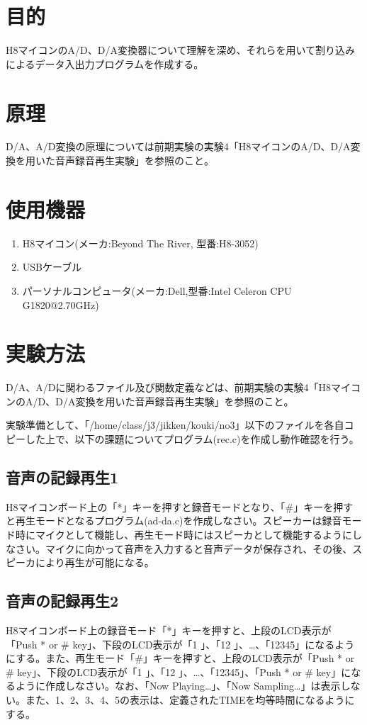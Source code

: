 \documentclass{jarticle}
\begin{document}
\section{目的}
H8マイコンのA/D、D/A変換器について理解を深め、それらを用いて割り込みによるデータ入出力プログラムを作成する。

\section{原理}
D/A、A/D変換の原理については前期実験の実験4「H8マイコンのA/D、D/A変換を用いた音声録音再生実験」を参照のこと。

\section{使用機器}
\begin{enumerate}
	\item H8マイコン(メーカ:Beyond The River, 型番:H8-3052)
	\item USBケーブル
	\item パーソナルコンピュータ(メーカ:Dell,型番:Intel Celeron CPU G1820@2.70GHz)
\end{enumerate}

\section{実験方法}
D/A、A/Dに関わるファイル及び関数定義などは、前期実験の実験4「H8マイコンのA/D、D/A変換を用いた音声録音再生実験」を参照のこと。

実験準備として、「/home/class/j3/jikken/kouki/no3」以下のファイルを各自コピーした上で、以下の課題についてプログラム(rec.c)を作成し動作確認を行う。

\subsection{音声の記録再生1}
H8マイコンボード上の「*」キーを押すと録音モードとなり、「\#」キーを押すと再生モードとなるプログラム(ad-da.c)を作成しなさい。スピーカーは録音モード時にマイクとして機能し、再生モード時にはスピーカとして機能するようにしなさい。マイクに向かって音声を入力すると音声データが保存され、その後、スピーカにより再生が可能になる。

\subsection{音声の記録再生2}
H8マイコンボード上の録音モード「*」キーを押すと、上段のLCD表示が「Push * or \# key」、下段のLCD表示が「1    」、「12  」、…、「12345」になるようにする。また、再生モード「\#」キーを押すと、上段のLCD表示が「Push * or \# key」、下段のLCD表示が「1    」、「12  」、…、「12345」、「Push * or \# key」になるように作成しなさい。なお、「Now Playing…」、「Now Sampling…」は表示しない。また、1、2、3、4、5の表示は、定義されたTIMEを均等時間になるようにする。
\end{document}
